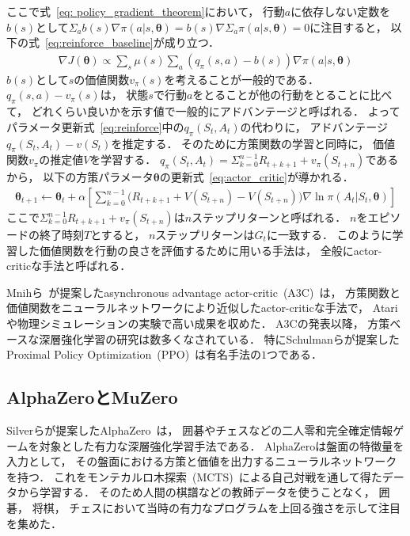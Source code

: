 ここで式~\ref{eq: policy_gradient_theorem}において， 行動$a$に依存しない定数を$b(s)$として$\Sigma_a b(s) \nabla \pi(a|s,\pmb{\theta}) = b(s) \nabla \Sigma_a \pi(a|s, \pmb{\theta}) = 0$に注目すると， 以下の式~\ref{eq:reinforce_baseline}が成り立つ．
\begin{align}
  \label{eq:reinforce_baseline}
  \nabla J(\pmb{\theta}) \propto \sum_s \mu(s) \sum_a \left(q_{\pi}(s,a) - b(s)\right) \nabla \pi(a|s, \pmb{\theta})
\end{align}
$b(s)$として$s$の価値関数$v_{\pi}(s)$を考えることが一般的である．
$q_{\pi}(s,a) - v_{\pi}(s)$は， 状態$s$で行動$a$をとることが他の行動をとることに比べて， どれくらい良いかを示す値で一般的にアドバンテージと呼ばれる．
よってパラメータ更新式~\ref{eq:reinforce}中の$q_\pi(S_t,A_t)$の代わりに， アドバンテージ$q_\pi(S_t,A_t) - v(S_t)$を推定する．
そのために方策関数の学習と同時に， 価値関数$v_\pi$の推定値$V$を学習する．
$q_\pi(S_t,A_t) = \Sigma_{k=0}^{n-1} R_{t+k+1} + v_\pi(S_{t+n})$であるから， 以下の方策パラメータ$\pmb{\theta}$の更新式~\ref{eq:actor_critic}が導かれる．
\begin{align}
  \label{eq:actor_critic}
  \pmb{\theta}_{t+1} \leftarrow \pmb{\theta}_{t} + \alpha \left[\sum_{k=0}^{n-1} \big(R_{t+k+1} + V(S_{t+n}) - V(S_{t+n})\big) \nabla \ln \pi(A_t|S_t, \pmb{\theta}) \right]
\end{align}
ここで$\Sigma_{k=0}^{n-1} R_{t+k+1} + v_\pi(S_{t+n})$は$n$ステップリターンと呼ばれる．
$n$をエピソードの終了時刻$T$とすると， $n$ステップリターンは$G_t$に一致する．
このように学習した価値関数を行動の良さを評価するために用いる手法は， 全般にactor-criticな手法と呼ばれる．

Mnihら~\cite{A3C}が提案したasynchronous advantage actor-critic~(A3C)~は， 方策関数と価値関数をニューラルネットワークにより近似したactor-criticな手法で， Atariや物理シミュレーションの実験で高い成果を収めた．
A3Cの発表以降， 方策ベースな深層強化学習の研究は数多くなされている．
特にSchulmanらが提案したProximal Policy Optimization~(PPO)~\cite{PPO}は有名手法の$1$つである．

\subsection{AlphaZeroとMuZero}
\label{subsec:zero}
Silverらが提案したAlphaZero~\cite{AlphaZero}は， 囲碁やチェスなどの二人零和完全確定情報ゲームを対象とした有力な深層強化学習手法である．
AlphaZeroは盤面の特徴量を入力として， その盤面における方策と価値を出力するニューラルネットワークを持つ．
これをモンテカルロ木探索~(MCTS)~による自己対戦を通して得たデータから学習する．
そのため人間の棋譜などの教師データを使うことなく， 囲碁， 将棋， チェスにおいて当時の有力なプログラムを上回る強さを示して注目を集めた．

